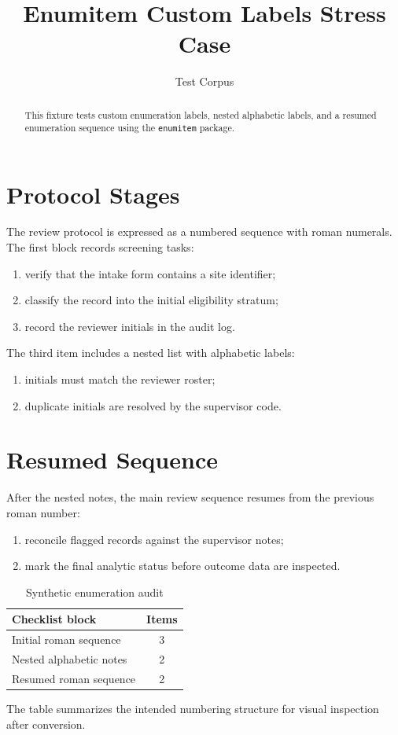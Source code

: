 \documentclass[11pt]{article}
\title{Enumitem Custom Labels Stress Case}
\author{Test Corpus}
\date{}
\begin{document}
\maketitle

\begin{abstract}
This fixture tests custom enumeration labels, nested alphabetic labels, and a
resumed enumeration sequence using the \texttt{enumitem} package.
\end{abstract}

\section{Protocol Stages}
\label{sec:protocol}

The review protocol is expressed as a numbered sequence with roman numerals.
The first block records screening tasks:
\begin{enumerate}[label=(\roman*),series=review,leftmargin=*]
\item verify that the intake form contains a site identifier;
\item classify the record into the initial eligibility stratum;
\item record the reviewer initials in the audit log.
\end{enumerate}

The third item includes a nested list with alphabetic labels:
\begin{enumerate}[label=\alph*),leftmargin=2em]
\item initials must match the reviewer roster;
\item duplicate initials are resolved by the supervisor code.
\end{enumerate}

\section{Resumed Sequence}
\label{sec:resumed}

After the nested notes, the main review sequence resumes from the previous roman
number:
\begin{enumerate}[resume=review,label=(\roman*),leftmargin=*]
\item reconcile flagged records against the supervisor notes;
\item mark the final analytic status before outcome data are inspected.
\end{enumerate}

\begin{table}[htbp]
\centering
\caption{Synthetic enumeration audit}
\label{tab:enum-audit}
\begin{tabular}{lc}
\toprule
Checklist block & Items \\
\midrule
Initial roman sequence & 3 \\
Nested alphabetic notes & 2 \\
Resumed roman sequence & 2 \\
\bottomrule
\end{tabular}
\end{table}

The table summarizes the intended numbering structure for visual inspection
after conversion.
\end{document}
